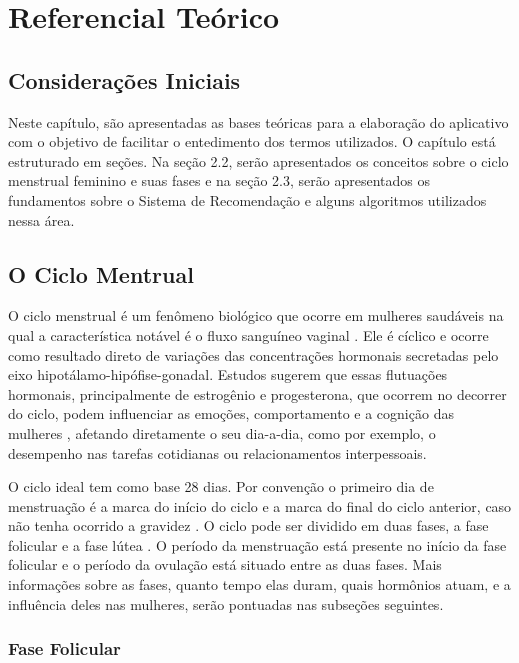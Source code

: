 \chapter[Referencial Teórico]{Referencial Teórico}

\section{Considerações Iniciais}

Neste capítulo, são apresentadas as bases teóricas para a elaboração do 
aplicativo com o objetivo de facilitar o entedimento dos termos utilizados. 
O capítulo está estruturado em seções. Na seção 2.2, serão apresentados os 
conceitos sobre o ciclo menstrual feminino e suas fases e na seção 2.3, serão 
apresentados os fundamentos sobre o Sistema de Recomendação e alguns algoritmos 
utilizados nessa área.

\section{O Ciclo Mentrual}

O ciclo menstrual é um fenômeno biológico que ocorre em mulheres saudáveis
na qual a característica notável é o fluxo sanguíneo vaginal \cite{guyton2012}.
Ele é cíclico e ocorre como resultado direto de variações das concentrações
hormonais secretadas pelo eixo hipotálamo-hipófise-gonadal. Estudos sugerem
que essas flutuações hormonais, principalmente de estrogênio e progesterona,
que ocorrem no decorrer do ciclo, podem influenciar as emoções,
comportamento e a cognição das mulheres \cite{poroma2014}, afetando
diretamente o seu dia-a-dia, como por exemplo, o desempenho nas tarefas
cotidianas ou relacionamentos interpessoais.


O ciclo ideal tem como base 28 dias. Por convenção o primeiro dia de
menstruação é a marca do início do ciclo e a marca do final do ciclo
anterior, caso não tenha ocorrido a gravidez \cite{lenton1984a}. O ciclo
pode ser dividido em duas fases, a fase folicular e a fase lútea
\cite{brondin2008}. O período da menstruação está presente no início da
fase folicular e o período da ovulação está situado entre as duas fases.
Mais informações sobre as fases, quanto tempo elas duram, quais hormônios
atuam, e a influência deles nas mulheres, serão pontuadas nas subseções
seguintes.


\subsection{Fase Folicular}

